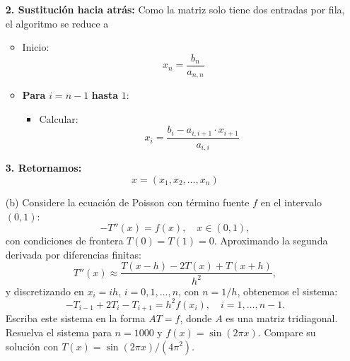 \begin{enumerate}
\begin{solution}
\textbf{2. Sustitución hacia atrás:} Como la matriz solo tiene dos entradas por fila, el algoritmo se reduce a 

\begin{itemize}
    \item Inicio:
    \[
    x_n = \frac{b_n}{a_{n, n}}
    \]
    \item \textbf{Para} $i = n-1$ \textbf{hasta} $1$:
    \begin{itemize}
        \item Calcular:
        \[
        x_i = \frac{b_i - a_{i, i+1} \cdot x_{i+1}}{a_{i, i}}
        \]
    \end{itemize}
\end{itemize}

\textbf{3. Retornamos:}
\[
x = (x_1, x_2, \dots, x_n)
\]

    \end{solution}
    \item[(b)] Considere la ecuación de Poisson con término fuente $f$ en el intervalo $(0, 1)$:
    \[
    -T''(x) = f(x), \quad x \in (0, 1),
    \]
    con condiciones de frontera $T(0) = T(1) = 0$. Aproximando la segunda derivada por diferencias finitas:
    \[
    T''(x) \approx \frac{T(x-h) - 2T(x) + T(x+h)}{h^2},
    \]
    y discretizando en $x_i = i h$, $i = 0, 1, \ldots, n$, con $n = 1/h$, obtenemos el sistema:
    \[
    -T_{i-1} + 2T_i - T_{i+1} = h^2 f(x_i), \quad i = 1, \ldots, n-1.
    \]
    Escriba este sistema en la forma $A T = f$, donde $A$ es una matriz tridiagonal. Resuelva el sistema para $n = 1000$ y $f(x) = \sin(2\pi x)$. Compare su solución con $T(x) = \sin(2\pi x) / (4\pi^2)$.
\end{enumerate}

